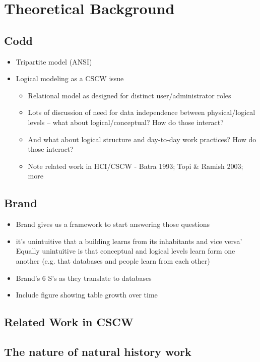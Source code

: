 \section{Theoretical Background}

\subsection{Codd}
\begin{itemize}
\item Tripartite model (ANSI)
\item Logical modeling as a CSCW issue
\begin{itemize}
\item Relational model as designed for distinct user/administrator roles
\item Lots of discussion of need for data independence between physical/logical levels – what about logical/conceptual? How do those interact?
\item And what about logical structure and day-to-day work practices? How do those interact?
\item Note related work in HCI/CSCW - Batra 1993; Topi & Ramish 2003; more
\end{itemize}
\end{itemize}


\subsection{Brand}

\begin{itemize}
\item Brand gives us a framework to start answering those questions
\item	it's unintuitive that a building learns from its inhabitants and vice versa’ Equally unintuitive is that conceptual and logical levels learn form one another (e.g. that databases and people learn from each other)
\item Brand’s 6 S’s as they translate to databases
\item Include figure showing table growth over time
\end{itemize}

\subsection{Related Work in CSCW}


\subsection{The nature of natural history work}

